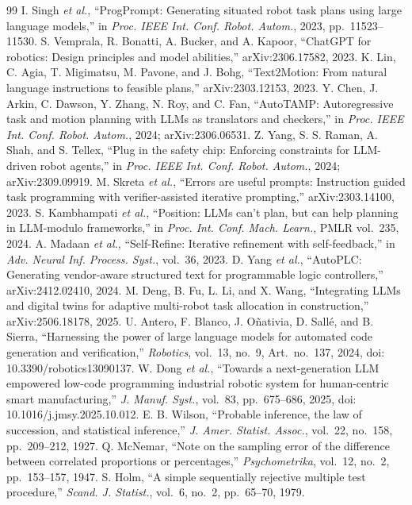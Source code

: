 \documentclass[journal]{IEEEtran}
\begin{document}
\begin{thebibliography}{99}
 I. Singh \emph{et al.}, ``ProgPrompt: Generating situated robot task plans using large language models,'' in \emph{Proc. IEEE Int. Conf. Robot. Autom.}, 2023, pp.~11523--11530.
 S. Vemprala, R. Bonatti, A. Bucker, and A. Kapoor, ``ChatGPT for robotics: Design principles and model abilities,'' arXiv:2306.17582, 2023.
 K. Lin, C. Agia, T. Migimatsu, M. Pavone, and J. Bohg, ``Text2Motion: From natural language instructions to feasible plans,'' arXiv:2303.12153, 2023.
 Y. Chen, J. Arkin, C. Dawson, Y. Zhang, N. Roy, and C. Fan, ``AutoTAMP: Autoregressive task and motion planning with LLMs as translators and checkers,'' in \emph{Proc. IEEE Int. Conf. Robot. Autom.}, 2024; arXiv:2306.06531.
 Z. Yang, S. S. Raman, A. Shah, and S. Tellex, ``Plug in the safety chip: Enforcing constraints for LLM-driven robot agents,'' in \emph{Proc. IEEE Int. Conf. Robot. Autom.}, 2024; arXiv:2309.09919.
 M. Skreta \emph{et al.}, ``Errors are useful prompts: Instruction guided task programming with verifier-assisted iterative prompting,'' arXiv:2303.14100, 2023.
 S. Kambhampati \emph{et al.}, ``Position: LLMs can't plan, but can help planning in LLM-modulo frameworks,'' in \emph{Proc. Int. Conf. Mach. Learn.}, PMLR vol.~235, 2024.
 A. Madaan \emph{et al.}, ``Self-Refine: Iterative refinement with self-feedback,'' in \emph{Adv. Neural Inf. Process. Syst.}, vol.~36, 2023.
 D. Yang \emph{et al.}, ``AutoPLC: Generating vendor-aware structured text for programmable logic controllers,'' arXiv:2412.02410, 2024.
 M. Deng, B. Fu, L. Li, and X. Wang, ``Integrating LLMs and digital twins for adaptive multi-robot task allocation in construction,'' arXiv:2506.18178, 2025.
 U. Antero, F. Blanco, J. O\~nativia, D. Sall\'e, and B. Sierra, ``Harnessing the power of large language models for automated code generation and verification,'' \emph{Robotics}, vol.~13, no.~9, Art.~no.~137, 2024, doi: 10.3390/robotics13090137.
 W. Dong \emph{et al.}, ``Towards a next-generation LLM empowered low-code programming industrial robotic system for human-centric smart manufacturing,'' \emph{J. Manuf. Syst.}, vol.~83, pp.~675--686, 2025, doi: 10.1016/j.jmsy.2025.10.012.
 E. B. Wilson, ``Probable inference, the law of succession, and statistical inference,'' \emph{J. Amer. Statist. Assoc.}, vol.~22, no.~158, pp.~209--212, 1927.
 Q. McNemar, ``Note on the sampling error of the difference between correlated proportions or percentages,'' \emph{Psychometrika}, vol.~12, no.~2, pp.~153--157, 1947.
 S. Holm, ``A simple sequentially rejective multiple test procedure,'' \emph{Scand. J. Statist.}, vol.~6, no.~2, pp.~65--70, 1979.
\end{thebibliography}
\end{document}
